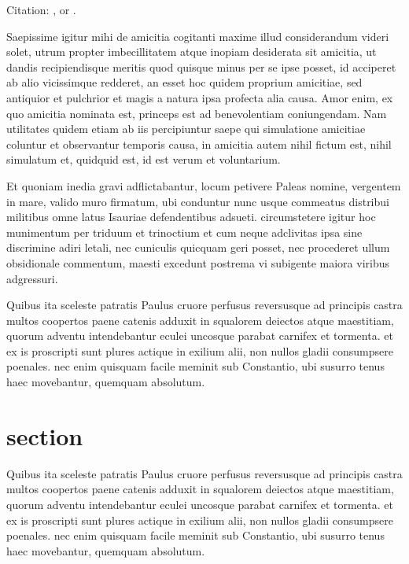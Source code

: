 
Citation: \cite{einstein}, or \cite{dirac}.

Saepissime igitur mihi de amicitia cogitanti maxime illud considerandum videri
solet, utrum propter imbecillitatem atque inopiam desiderata sit amicitia, ut
dandis recipiendisque meritis quod quisque minus per se ipse posset, id
acciperet ab alio vicissimque redderet, an esset hoc quidem proprium amicitiae,
sed antiquior et pulchrior et magis a natura ipsa profecta alia causa. Amor
enim, ex quo amicitia nominata est, princeps est ad benevolentiam coniungendam.
Nam utilitates quidem etiam ab iis percipiuntur saepe qui simulatione amicitiae
coluntur et observantur temporis causa, in amicitia autem nihil fictum est,
nihil simulatum et, quidquid est, id est verum et voluntarium.

Et quoniam inedia gravi adflictabantur, locum petivere Paleas nomine, vergentem
in mare, valido muro firmatum, ubi conduntur nunc usque commeatus distribui
militibus omne latus Isauriae defendentibus adsueti. circumstetere igitur hoc
munimentum per triduum et trinoctium et cum neque adclivitas ipsa sine
discrimine adiri letali, nec cuniculis quicquam geri posset, nec procederet
ullum obsidionale commentum, maesti excedunt postrema vi subigente maiora
viribus adgressuri.

Quibus ita sceleste patratis Paulus cruore perfusus reversusque ad principis
castra multos coopertos paene catenis adduxit in squalorem deiectos atque
maestitiam, quorum adventu intendebantur eculei uncosque parabat carnifex et
tormenta. et ex is proscripti sunt plures actique in exilium alii, non nullos
gladii consumpsere poenales. nec enim quisquam facile meminit sub Constantio,
ubi susurro tenus haec movebantur, quemquam absolutum.

\section{section}

Quibus ita sceleste patratis Paulus cruore perfusus reversusque ad principis
castra multos coopertos paene catenis adduxit in squalorem deiectos atque
maestitiam, quorum adventu intendebantur eculei uncosque parabat carnifex et
tormenta. et ex is proscripti sunt plures actique in exilium alii, non nullos
gladii consumpsere poenales. nec enim quisquam facile meminit sub Constantio,
ubi susurro tenus haec movebantur, quemquam absolutum.

